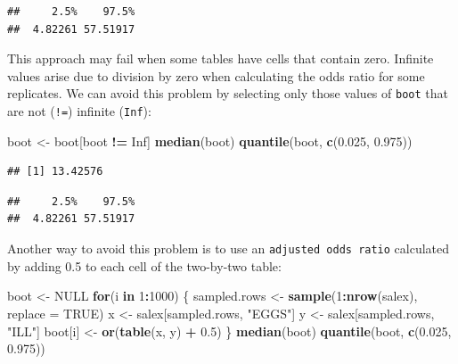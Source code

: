 \documentclass[12pt,a4paper]{book}
\newenvironment{Shaded}{\begin{snugshade}}{\end{snugshade}}
\newcommand{\KeywordTok}[1]{\textcolor[rgb]{0.13,0.29,0.53}{\textbf{#1}}}
\newcommand{\DataTypeTok}[1]{\textcolor[rgb]{0.13,0.29,0.53}{#1}}
\newcommand{\DecValTok}[1]{\textcolor[rgb]{0.00,0.00,0.81}{#1}}
\newcommand{\FloatTok}[1]{\textcolor[rgb]{0.00,0.00,0.81}{#1}}
\newcommand{\StringTok}[1]{\textcolor[rgb]{0.31,0.60,0.02}{#1}}
\newcommand{\OtherTok}[1]{\textcolor[rgb]{0.56,0.35,0.01}{#1}}
\newcommand{\ControlFlowTok}[1]{\textcolor[rgb]{0.13,0.29,0.53}{\textbf{#1}}}
\newcommand{\OperatorTok}[1]{\textcolor[rgb]{0.81,0.36,0.00}{\textbf{#1}}}
\newcommand{\NormalTok}[1]{#1}
\theoremstyle{definition}
\theoremstyle{definition}
\theoremstyle{definition}
\theoremstyle{remark}
\begin{document}
\begin{verbatim}
##     2.5%    97.5% 
##  4.82261 57.51917
\end{verbatim}

This approach may fail when some tables have cells that contain zero.
Infinite values arise due to division by zero when calculating the odds
ratio for some replicates. We can avoid this problem by selecting only
those values of \texttt{boot} that are not (\texttt{!=}) infinite
(\texttt{Inf}):

\begin{Shaded}
\begin{Highlighting}[]
\NormalTok{boot <-}\StringTok{ }\NormalTok{boot[boot }\OperatorTok{!=}\StringTok{ }\OtherTok{Inf}\NormalTok{]}
\KeywordTok{median}\NormalTok{(boot)}
\KeywordTok{quantile}\NormalTok{(boot, }\KeywordTok{c}\NormalTok{(}\FloatTok{0.025}\NormalTok{, }\FloatTok{0.975}\NormalTok{))}
\end{Highlighting}
\end{Shaded}

\begin{verbatim}
## [1] 13.42576
\end{verbatim}

\begin{verbatim}
##     2.5%    97.5% 
##  4.82261 57.51917
\end{verbatim}

Another way to avoid this problem is to use an
\texttt{adjusted\ odds\ ratio} calculated by adding 0.5 to each cell of
the two-by-two table:

\begin{Shaded}
\begin{Highlighting}[]
\NormalTok{boot <-}\StringTok{ }\OtherTok{NULL}
\ControlFlowTok{for}\NormalTok{(i }\ControlFlowTok{in} \DecValTok{1}\OperatorTok{:}\DecValTok{1000}\NormalTok{) \{}
\NormalTok{  sampled.rows <-}\StringTok{ }\KeywordTok{sample}\NormalTok{(}\DecValTok{1}\OperatorTok{:}\KeywordTok{nrow}\NormalTok{(salex), }\DataTypeTok{replace =} \OtherTok{TRUE}\NormalTok{)}
\NormalTok{  x <-}\StringTok{ }\NormalTok{salex[sampled.rows, }\StringTok{"EGGS"}\NormalTok{]}
\NormalTok{  y <-}\StringTok{ }\NormalTok{salex[sampled.rows, }\StringTok{"ILL"}\NormalTok{]}
\NormalTok{  boot[i] <-}\StringTok{ }\KeywordTok{or}\NormalTok{(}\KeywordTok{table}\NormalTok{(x, y) }\OperatorTok{+}\StringTok{ }\FloatTok{0.5}\NormalTok{)}
\NormalTok{  \}}
\KeywordTok{median}\NormalTok{(boot)}
\KeywordTok{quantile}\NormalTok{(boot, }\KeywordTok{c}\NormalTok{(}\FloatTok{0.025}\NormalTok{, }\FloatTok{0.975}\NormalTok{))}
\end{Highlighting}
\end{Shaded}
\end{document}
